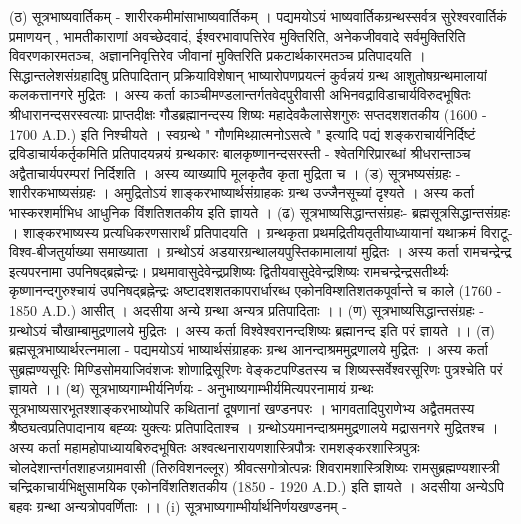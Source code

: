 (ठ) सूत्रभाष्यवार्तिकम् - शारीरकमीमांसाभाष्यवार्तिकम् । 
पद्यमयोऽयं भाष्यवार्तिकग्रन्थस्सर्वत्र सुरेश्वरवार्तिकं प्रमाणयन् , भामतीकाराणां अवच्छेदवादं, ईश्वरभावापत्तिरेव मुक्तिरिति, अनेकजीववादे सर्वमुक्तिरिति विवरणकारमतञ्च, अज्ञाननिवृत्तिरेव जीवानां मुक्तिरिति प्रकटार्थकारमतञ्च प्रतिपादयति । सिद्धान्तलेशसंग्रहादिषु प्रतिपादितान् प्रक्रियाविशेषान् भाष्यारोपणप्रयत्नं कुर्वन्नयं ग्रन्थ आशुतोषग्रन्थमालायां कलकत्तानगरे मुद्रितः । 
अस्य कर्ता काञ्चीमण्डलान्तर्गतवेदपुरीवासी अभिनवद्राविडाचार्यविरुदभूषितः श्रीधारानन्दसरस्वत्याः प्राप्तदीक्षः गौडब्रह्मानन्दस्य शिष्यः महादेवकैलासेशगुरुः सप्तदशशतकीय (1600 - 1700 A.D.) इति निश्चीयते । स्वग्रन्थे " गौणमिथ्य़ात्मनोऽसत्वे " इत्यादि पद्यं शङ्कराचार्यनिर्दिष्टं द्रविडाचार्यकर्तृकमिति प्रतिपादयन्नयं ग्रन्थकारः बालकृष्णानन्दसरस्ती - श्वेतगिरिप्रारब्धां श्रीधरान्ताञ्च अद्वैताचार्यपरम्परां निर्दिशति । अस्य व्याख्यापि मूलकृतैव कृता मुद्रिता च ।  
(ड) सूत्रभष्यसंग्रहः - शारीरकभाष्यसंग्रहः ।
अमुद्रितोऽयं शाङ्करभाष्यार्थसंग्राहकः ग्रन्थ उज्जैनसूच्यां दृश्यते । अस्य कर्ता भास्करशर्माभिध आधुनिक विंशतिशतकीय इति ज्ञायते । 
(ढ) सूत्रभाष्यसिद्धान्तसंग्रहः- ब्रह्मसूत्रसिद्धान्तसंग्रहः । 
शाङ्करभाष्यस्य प्रत्यधिकरणसारार्थं प्रतिपादयति । ग्रन्थकृता प्रथमद्रितीयतृतीयाध्यायानां यथाक्रमं विराटू-विश्व-बीजतुर्याख्या समाख्याता । ग्रन्थोऽयं अडयारग्रन्थालयपुस्तिकामालायां मुद्रितः । अस्य कर्ता रामचन्द्रेन्द्र इत्यपरनामा उपनिषद्ब्रह्मेन्द्रः। प्रथमावासुदेवेन्द्रप्रशिष्यः द्वितीयवासुदेवेन्द्रशिष्यः रामचन्द्रेन्द्रसतीर्थ्यः कृष्णानन्दगुरुश्चायं उपनिषद्ब्रह्नेन्द्रः अष्टादशशतकापरार्धारब्ध एकोनविम्शतिशतकपूर्वान्ते च काले (1760 - 1850 A.D.) आसीत् । अदसीया अन्ये ग्रन्था अन्यत्र प्रतिपादिताः ।।
(ण) सूत्रभाष्यसिद्धान्तसंग्रहः -
ग्रन्थोऽयं चौखाम्बामुद्रणालये मुद्रितः । अस्य कर्ता विश्वेश्वरानन्दशिष्यः ब्रह्मानन्द इति परं ज्ञायते ।।
(त) ब्रह्मसूत्रभाष्यार्थरत्नमाला - 
पद्यमयोऽयं भाष्यार्थसंग्राहकः ग्रन्थ आनन्दाश्रममुद्रणालये मुद्रितः । अस्य कर्ता सुब्रह्मण्यसूरिः मिण्डिसोमयाजिवंशजः शोणाद्रिसूरिणः वेङ्कटपण्डितस्य च शिष्यस्सर्वेश्वरसूरिणः पुत्रश्चेति परं ज्ञायते ।। 
(थ) सूत्रभाष्यगाम्भीर्यनिर्णयः - 
अनुभाष्यगाम्भीर्यमित्यपरनामायं ग्रन्थः सूत्रभाष्यसारभूतश्शाङ्करभाष्योपरि कथितानां दूषणानां खण्डनपरः । भागवतादिपुराणेभ्य अद्वैतमतस्य श्रैष्ठ्यत्वप्रतिपादानाय बह्व्यः युक्त्यः प्रतिपादिताश्च । ग्रन्थोऽयमानन्दाश्रममुद्रणालये मद्रासनगरे मुद्रितश्च । अस्य कर्ता महामहोपाध्यायबिरुदभूषितः अश्वत्थनारायणशास्त्रिपौत्रः रामशङ्करशास्त्रिपुत्रः चोलदेशान्तर्गतशाहजग्रामवासी (तिरुविशनल्लूर) श्रीवत्सगोत्रोत्पन्नः शिवरामशास्त्रिशिष्यः रामसुब्रह्मण्यशास्त्री चन्द्रिकाचार्यभिक्षुसामयिक एकोनविंशतिशतकीय (1850 - 1920 A.D.) इति ज्ञायते । अदसीया अन्येऽपि बहवः ग्रन्था अन्यत्रोपवर्णिताः ।। 
(i) सूत्रभाष्यगाम्भीर्यार्थनिर्णयखण्डनम् - 
